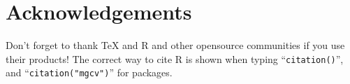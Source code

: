 \documentclass[11pt, a4paper]{article} %
\begin{document}
\section{Acknowledgements}%
Don't forget to thank TeX and R and other opensource communities if you use their products! The correct way to cite R is shown when typing ``\texttt{citation()}'', and ``\texttt{citation("mgcv")}'' for packages.

\clearpage
\end{document}
